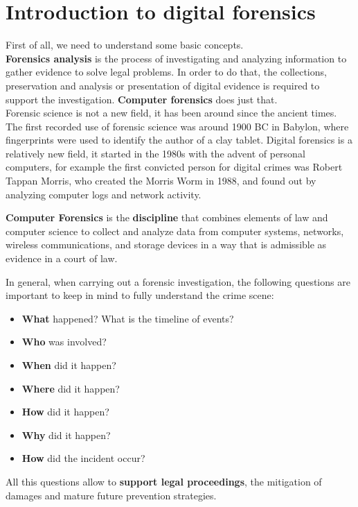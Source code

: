 \chapter{Introduction to digital forensics}
First of all, we need to understand some basic concepts. \\
\textbf{Forensics analysis} is the process of investigating and
analyzing information to gather evidence to solve legal problems. In
order to do that, the collections, preservation and analysis or
presentation of digital evidence is required to support the
investigation. \textbf{Computer forensics} does just that.\\
Forensic science is not a new field, it has been around since the
ancient times. The first recorded use of forensic science was around
1900 BC in Babylon, where fingerprints were used to identify the 
author of a clay tablet. Digital forensics is a relatively new field,
it started in the 1980s with the advent of personal computers, for
example the first convicted person for digital crimes was Robert
Tappan Morris, who created the Morris Worm in 1988, and found out by
analyzing computer logs and network activity.
\begin{boxH}
  \textbf{Computer Forensics} is the \textbf{discipline} that combines elements
  of law and computer science to collect and analyze data from computer
  systems, networks, wireless communications, and storage devices in a way that
  is admissible as evidence in a court of law.
\end{boxH}
In general, when carrying out a forensic investigation, the following
questions are important to keep in mind to fully understand the 
crime scene:
\begin{itemize}
  \item \textbf{What} happened? What is the timeline of events?
  \item \textbf{Who} was involved?
  \item \textbf{When} did it happen?
  \item \textbf{Where} did it happen?
  \item \textbf{How} did it happen?
  \item \textbf{Why} did it happen?
  \item \textbf{How} did the incident occur?
\end{itemize}
All this questions allow to \textbf{support legal proceedings}, the mitigation
of damages and mature future prevention strategies.
